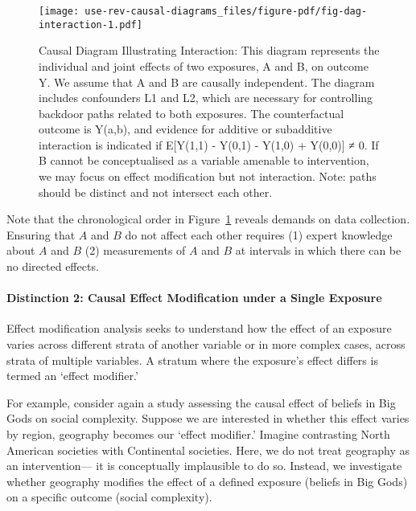 \documentclass[
  singlecolumn,
  9pt]{article}
\let\oldparagraph\paragraph
\renewcommand{\paragraph}[1]{\oldparagraph{#1}\mbox{}}
\begin{document}
\begin{figure}

{\centering \texttt{[image: use-rev-causal-diagrams\_files/figure-pdf/fig-dag-interaction-1.pdf]}

}

\caption{\label{fig-dag-interaction}Causal Diagram Illustrating
Interaction: This diagram represents the individual and joint effects of
two exposures, A and B, on outcome Y. We assume that A and B are
causally independent. The diagram includes confounders L1 and L2, which
are necessary for controlling backdoor paths related to both exposures.
The counterfactual outcome is Y(a,b), and evidence for additive or
subadditive interaction is indicated if E{[}Y(1,1) - Y(0,1) - Y(1,0) +
Y(0,0){]} ≠ 0. If B cannot be conceptualised as a variable amenable to
intervention, we may focus on effect modification but not interaction.
Note: paths should be distinct and not intersect each other.}

\end{figure}

Note that the chronological order in Figure~\ref{fig-dag-interaction}
reveals demands on data collection. Ensuring that \(A\) and \(B\) do not
affect each other requires (1) expert knowledge about \(A\) and \(B\)
(2) measurements of \(A\) and \(B\) at intervals in which there can be
no directed effects.

\paragraph{Distinction 2: Causal Effect Modification under a Single
Exposure}\label{distinction-2-causal-effect-modification-under-a-single-exposure}

Effect modification analysis seeks to understand how the effect of an
exposure varies across different strata of another variable or in more
complex cases, across strata of multiple variables. A stratum where the
exposure's effect differs is termed an `effect modifier.'

For example, consider again a study assessing the causal effect of
beliefs in Big Gods on social complexity. Suppose we are interested in
whether this effect varies by region, geography becomes our `effect
modifier.' Imagine contrasting North American societies with Continental
societies. Here, we do not treat geography as an intervention--- it is
conceptually implausible to do so. Instead, we investigate whether
geography modifies the effect of a defined exposure (beliefs in Big
Gods) on a specific outcome (social complexity).
\end{document}
